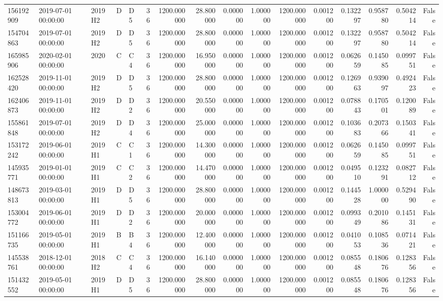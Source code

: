 \begin{tabular}{lllllrrrrrrrrrrr}
156192909 & 2019-07-01 00:00:00 & 2019H2 & D & D5 & 36 & 1200.000000 & 28.800000 & 0.000000 & 1.000000 & 1200.000000 & 0.001200 & 0.132297 & 0.958780 & 0.504214 & False \\
154704863 & 2019-07-01 00:00:00 & 2019H2 & D & D5 & 36 & 1200.000000 & 28.800000 & 0.000000 & 1.000000 & 1200.000000 & 0.001200 & 0.132297 & 0.958780 & 0.504214 & False \\
165985906 & 2020-02-01 00:00:00 & 2020 & C & C4 & 36 & 1200.000000 & 16.950000 & 0.000000 & 1.000000 & 1200.000000 & 0.001200 & 0.062659 & 0.145085 & 0.099751 & False \\
162528420 & 2019-11-01 00:00:00 & 2019H2 & D & D5 & 36 & 1200.000000 & 28.800000 & 0.000000 & 1.000000 & 1200.000000 & 0.001200 & 0.126963 & 0.939097 & 0.492423 & False \\
162406873 & 2019-11-01 00:00:00 & 2019H2 & D & D2 & 36 & 1200.000000 & 20.550000 & 0.000000 & 1.000000 & 1200.000000 & 0.001200 & 0.078843 & 0.170501 & 0.120089 & False \\
155861848 & 2019-07-01 00:00:00 & 2019H2 & D & D4 & 36 & 1200.000000 & 25.000000 & 0.000000 & 1.000000 & 1200.000000 & 0.001200 & 0.103683 & 0.207366 & 0.150341 & False \\
153172242 & 2019-06-01 00:00:00 & 2019H1 & C & C1 & 36 & 1200.000000 & 14.300000 & 0.000000 & 1.000000 & 1200.000000 & 0.001200 & 0.062659 & 0.145085 & 0.099751 & False \\
145935771 & 2019-01-01 00:00:00 & 2019H1 & C & C2 & 36 & 1200.000000 & 14.470000 & 0.000000 & 1.000000 & 1200.000000 & 0.001200 & 0.049510 & 0.123291 & 0.082712 & False \\
148673813 & 2019-03-01 00:00:00 & 2019H1 & D & D5 & 36 & 1200.000000 & 28.800000 & 0.000000 & 1.000000 & 1200.000000 & 0.001200 & 0.144528 & 1.000000 & 0.529490 & False \\
153004772 & 2019-06-01 00:00:00 & 2019H1 & D & D2 & 36 & 1200.000000 & 20.000000 & 0.000000 & 1.000000 & 1200.000000 & 0.001200 & 0.099349 & 0.201086 & 0.145131 & False \\
151166735 & 2019-05-01 00:00:00 & 2019H1 & B & B4 & 36 & 1200.000000 & 12.400000 & 0.000000 & 1.000000 & 1200.000000 & 0.001200 & 0.041053 & 0.108536 & 0.071421 & False \\
145538761 & 2018-12-01 00:00:00 & 2018H2 & C & C4 & 36 & 1200.000000 & 16.140000 & 0.000000 & 1.000000 & 1200.000000 & 0.001200 & 0.085548 & 0.180676 & 0.128356 & False \\
151432552 & 2019-05-01 00:00:00 & 2019H1 & D & D5 & 36 & 1200.000000 & 28.800000 & 0.000000 & 1.000000 & 1200.000000 & 0.001200 & 0.085548 & 0.180676 & 0.128356 & False \\

\end{tabular}

